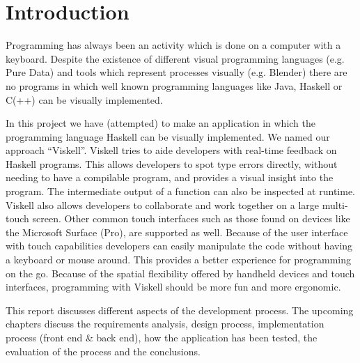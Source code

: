 \chapter{Introduction}

Programming has always been an activity which is done on a computer with a keyboard. Despite the existence of different visual programming languages (e.g. Pure Data) and tools which represent processes visually (e.g. Blender) there are no programs in which well known programming languages like Java, Haskell or C(++) can be visually implemented. 

In this project we have (attempted) to make an application in which the programming language Haskell can be visually implemented. We named our approach ``Viskell''. Viskell tries to aide developers with real-time feedback on Haskell programs. This allows developers to spot type errors directly, without needing to have a compilable program, and provides a visual insight into the program. The intermediate output of a function can also be inspected at runtime. Viskell also allows developers to collaborate and work together on a large multi-touch screen. Other common touch interfaces such as those found on devices like the Microsoft Surface (Pro), are supported as well. Because of the user interface with touch capabilities developers can easily manipulate the code without having a keyboard or mouse around. This provides a better experience for programming on the go. Because of the spatial flexibility offered by handheld devices and touch interfaces, programming with Viskell should be more fun and more ergonomic.

This report discusses different aspects of the development process. The upcoming chapters discuss the requirements analysis, design process, implementation process (front end \& back end), how the application has been tested, the evaluation of the process and the conclusions.
